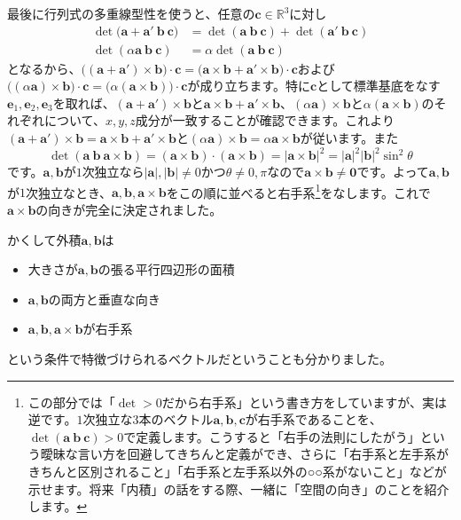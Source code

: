 最後に行列式の多重線型性を使うと、任意の$\bm{c} \in \mathbb{R}^3$に対し
\begin{align*}
\det\bigl(\bm{a} + \bm{a}'  \ \bm{b} \ \bm{c}\bigr) &= \det(\bm{a} \ \bm{b} \ \bm{c}) + \det(\bm{a}' \ \bm{b} \ \bm{c}) \\
\det(\alpha \bm{a} \ \bm{b} \ \bm{c}) &= \alpha \det(\bm{a} \ \bm{b} \ \bm{c})
\end{align*}
となるから、$\bigl((\bm{a} + \bm{a}') \times \bm{b}\bigr) \cdot \bm{c} = \bigl(\bm{a} \times \bm{b} + \bm{a}' \times \bm{b}\bigr) \cdot \bm{c}$および$\bigl((\alpha \bm{a}) \times \bm{b}\bigr) \cdot \bm{c} = \bigl(\alpha (\bm{a} \times \bm{b})\bigr) \cdot \bm{c}$が成り立ちます。特に$\bm{c}$として標準基底をなす$\bm{e}_1, \bm{e}_2, \bm{e}_3$を取れば、$(\bm{a} + \bm{a}') \times \bm{b}$と$\bm{a} \times \bm{b} + \bm{a}' \times \bm{b}$、$(\alpha \bm{a}) \times \bm{b}$と$\alpha(\bm{a} \times \bm{b})$のそれぞれについて、$x, y, z$成分が一致することが確認できます。これより$(\bm{a} + \bm{a}') \times \bm{b} = \bm{a} \times \bm{b} + \bm{a}' \times \bm{b}$と$(\alpha \bm{a}) \times \bm{b} = \alpha \bm{a} \times \bm{b}$が従います。また
\[
\det (\bm{a} \ \bm{b} \ \bm{a} \times \bm{b}) = (\bm{a} \times \bm{b})\cdot (\bm{a} \times \bm{b}) = |\bm{a} \times \bm{b}|^2 = |\bm{a}|^2 |\bm{b}|^2 \sin^2 \theta
\]
です。$\bm{a}, \bm{b}$が$1$次独立なら$|\bm{a}|, |\bm{b}| \neq 0$かつ$\theta \neq 0, \pi$なので$\bm{a} \times \bm{b} \neq \bm{0}$です。よって$\bm{a}, \bm{b}$が$1$次独立なとき、$\bm{a}, \bm{b}, \bm{a} \times \bm{b}$をこの順に並べると右手系\footnote{この部分では「$\det > 0$だから右手系」という書き方をしていますが、実は逆です。$1$次独立な$3$本のベクトル$\bm{a}, \bm{b}, \bm{c}$が右手系であることを、$\det(\bm{a} \ \bm{b} \ \bm{c}) > 0$で定義します。こうすると「右手の法則にしたがう」という曖昧な言い方を回避してきちんと定義ができ、さらに「右手系と左手系がきちんと区別されること」「右手系と左手系以外の○○系がないこと」などが示せます。将来「内積」の話をする際、一緒に「空間の向き」のことを紹介します。}をなします。これで$\bm{a} \times \bm{b}$の向きが完全に決定されました。

かくして外積$\bm{a}, \bm{b}$は
\begin{itemize}
\item 大きさが$\bm{a}, \bm{b}$の張る平行四辺形の面積
\item $\bm{a}, \bm{b}$の両方と垂直な向き
\item $\bm{a}, \bm{b}, \bm{a} \times \bm{b}$が右手系
\end{itemize}
という条件で特徴づけられるベクトルだということも分かりました。

